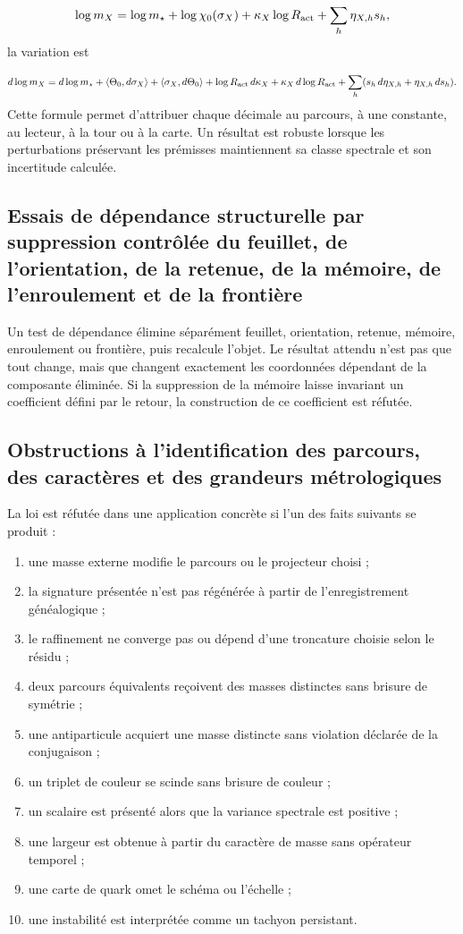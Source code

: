 \[
 \log m_X=
 \log m_\star+
 \log\chi_0(\sigma_X)
 +\kappa_X\log R_{\rm act}
 +\sum_h\eta_{X,h}s_h,
\]
la variation est

\[
 d\log m_X
 =d\log m_\star
 +\langle\Theta_0,d\sigma_X\rangle
 +\langle\sigma_X,d\Theta_0\rangle
 +\log R_{\rm act}\,d\kappa_X
 +\kappa_X\,d\log R_{\rm act}
 +\sum_h(s_h\,d\eta_{X,h}+\eta_{X,h}\,ds_h).
\]
Cette formule permet d'attribuer chaque décimale au parcours, à une constante, au lecteur, à la tour ou à la carte. Un résultat est robuste lorsque les perturbations préservant les prémisses maintiennent sa classe spectrale et son incertitude calculée.

\subsection{Essais de dépendance structurelle par suppression contrôlée du feuillet, de l'orientation, de la retenue, de la mémoire, de l'enroulement et de la frontière}
Un test de dépendance élimine séparément feuillet, orientation, retenue, mémoire, enroulement ou frontière, puis recalcule l'objet. Le résultat attendu n'est pas que tout change, mais que changent exactement les coordonnées dépendant de la composante éliminée. Si la suppression de la mémoire laisse invariant un coefficient défini par le retour, la construction de ce coefficient est réfutée.

\subsection{Obstructions à l'identification des parcours, des caractères et des grandeurs métrologiques}
La loi est réfutée dans une application concrète si l'un des faits suivants se produit :

\begin{enumerate}
\item une masse externe modifie le parcours ou le projecteur choisi ;
\item la signature présentée n'est pas régénérée à partir de l'enregistrement généalogique ;
\item le raffinement ne converge pas ou dépend d'une troncature choisie selon le résidu ;
\item deux parcours équivalents reçoivent des masses distinctes sans brisure de symétrie ;
\item une antiparticule acquiert une masse distincte sans violation déclarée de la conjugaison ;
\item un triplet de couleur se scinde sans brisure de couleur ;
\item un scalaire est présenté alors que la variance spectrale est positive ;
\item une largeur est obtenue à partir du caractère de masse sans opérateur temporel ;
\item une carte de quark omet le schéma ou l'échelle ;
\item une instabilité est interprétée comme un tachyon persistant.
\end{enumerate}
